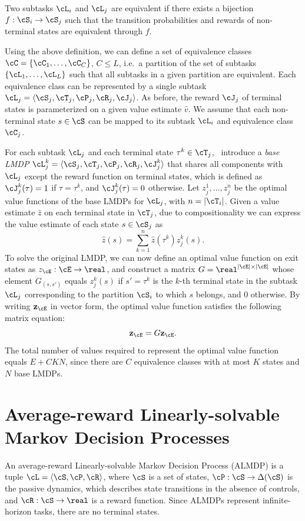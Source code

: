 \begin{definition}
  Two subtasks $\cL_i$ and $\cL_j$ are equivalent if there exists a bijection $f:\cS_i\rightarrow\cS_j$ such that the transition probabilities and rewards of non-terminal states are equivalent through $f$.
\end{definition}
Using the above definition, we can define a set of equivalence classes $\cC=\{\cC_1,\ldots,\cC_C\}$, $C\leq L$, i.e.~a partition of the set of subtasks $\{\cL_1,\ldots,\cL_L\}$ such that all subtasks in a given partition are equivalent. Each equivalence class can be represented by a single subtask $\cL_j=\langle\cS_j,\cT_j,\cP_j,\cR_j,\cJ_j\rangle$. As before, the reward $\cJ_j$ of terminal states is parameterized on a given value estimate $\hat{v}$. We assume that each non-terminal state $s\in\cS$ can be mapped to its subtask $\cL_i$ and equivalence class $\cC_j$.

For each subtask $\cL_j$ and each terminal state $\tau^k\in\cT_j$, \citet{Infante2022}~introduce a {\em base LMDP} $\cL_j^k=\langle\cS_j,\cT_j,\cP_j,\cR_j,\cJ_j^k\rangle$ that shares all components with $\cL_j$ except the reward function on terminal states, which is defined as $\cJ_j^k(\tau)=1$ if $\tau=\tau^k$, and $\cJ_j^k(\tau)=0$ otherwise. Let $z_j^1,\ldots,z_j^n$ be the optimal value functions of the base LMDPs for $\cL_j$, with $n=|\cT_i|$. Given a value estimate $\hat z$ on each terminal state in $\cT_j$, due to compositionality we can express the value estimate of each state $s\in\cS_j$ as
\[
\hat z(s) = \sum_{k=1}^n \hat z(\tau^k) z_j^k(s).
\]
To solve the original LMDP, we can now define an optimal value function on exit states as $z_\cE:\cE\rightarrow\real$, and construct a matrix $G=\real^{|\cE|\times|\cE|}$ whose element $G_{(s,s')}$ equals $z_j^k(s)$ if $s'=\tau^k$ is the $k$-th terminal state in the subtask $\cL_j$ corresponding to the partition $\cS_i$ to which $s$ belongs, and $0$ otherwise. By writing ${\bf z}_\cE$ in vector form, the optimal value function satisfies the following matrix equation:
\[
{\bf z}_\cE = G {\bf z}_\cE.
\]
The total number of values required to represent the optimal value function equals $E + CKN$, since there are $C$ equivalence classes with at most $K$ states and $N$ base LMDPs.

\section{Average-reward Linearly-solvable Markov Decision Processes}

An average-reward Linearly-solvable Markov Decision Process (ALMDP) is a tuple
$\cL = \langle\cS,\cP,\cR\rangle$, where $\cS$ is a set of states, $\cP:\cS\rightarrow\Delta(\cS)$ is the passive dynamics, which describes state transitions in the absence of controls, and $\cR:\cS\rightarrow\real$ is a reward function. Since ALMDPs represent infinite-horizon tasks, there are no terminal states.

